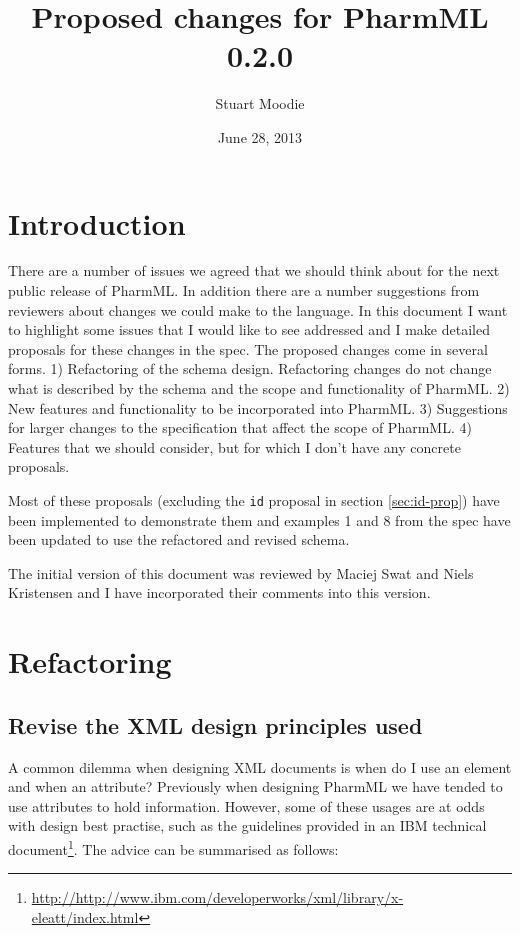 \documentclass[a4paper,11pt]{article}
\author{Stuart Moodie}
\date{June 28, 2013}
\title{Proposed changes for PharmML 0.2.0}
\newcommand{\pharmml}{PharmML\xspace}
\newcommand{\xatt}[1]{\texttt{#1}\index{XML Attribute!\texttt{#1}}}
\begin{document}
\maketitle

\tableofcontents

\section{Introduction}

There are a number of issues we agreed that we should think about for
the next public release of \pharmml. In addition there are a number
suggestions from reviewers about changes we could make to the
language. In this document I want to highlight some issues that I
would like to see addressed and I make detailed proposals for these
changes in the spec. The proposed changes come in several forms. 1)
Refactoring of the schema design. Refactoring changes do not change
what is described by the schema and the scope and functionality of
\pharmml. 2) New features and functionality to be incorporated into
\pharmml. 3) Suggestions for larger changes to the specification that
affect the scope of \pharmml. 4) Features that we should consider, but
for which I don't have any concrete proposals.

Most of these proposals (excluding the \xatt{id} proposal in section
\ref{sec:id-prop}) have been implemented to demonstrate them and
examples 1 and 8 from the spec have been updated to use the refactored
and revised schema.

The initial version of this document was reviewed by Maciej Swat and
Niels Kristensen and I have incorporated their comments into this version.

\section{Refactoring}

\subsection{Revise the XML design principles used}

A common dilemma when designing XML documents is when do I use an
element and when an attribute? Previously when designing \pharmml we
have tended to use attributes to hold information. However, some of
these usages are at odds with design best practise, such as the guidelines provided in an IBM technical
document\footnote{\url{http://http://www.ibm.com/developerworks/xml/library/x-eleatt/index.html}}. The
advice can be summarised as follows:
\end{document}
